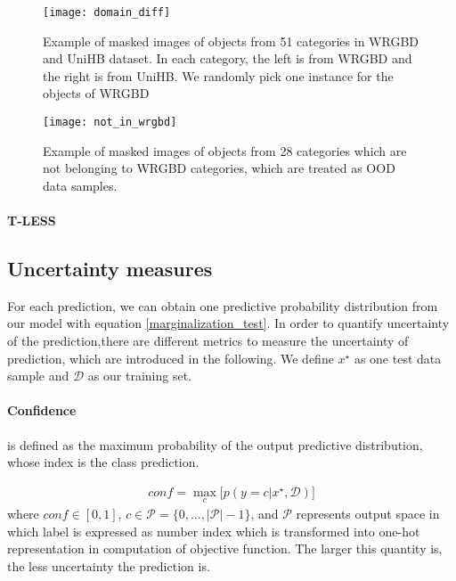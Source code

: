  \begin{figure}[H]
 	\begin{center}
 		\texttt{[image: domain\_diff]}
 		\caption{Example of masked images of objects from 51 categories in WRGBD and UniHB dataset. In each category, the left is from WRGBD and the right is from UniHB. We randomly pick one instance for the objects of WRGBD}		
 		\label{fig:wrgbd2}
 	\end{center}
 \end{figure}

\begin{figure}[H]
	\begin{center}
		\texttt{[image: not\_in\_wrgbd]}
		\caption{Example of masked images of objects from 28 categories which are not belonging to WRGBD categories, which are treated as OOD data samples.}		
		\label{fig:not_in_wrgbd}
	\end{center}
\end{figure} 

\paragraph{T-LESS\cite{hodan2017tless}}


\subsection{Uncertainty measures}
For each prediction, we can obtain one predictive probability distribution from our model with equation \ref{marginalization_test}. In order to quantify uncertainty of the prediction,there are different metrics to measure the uncertainty of prediction, which are introduced in the following. We define $x^\star$ as one test data sample and $\mathcal D$ as our training set. 
\paragraph{Confidence} is defined as the maximum probability of the output predictive distribution, whose index is the class prediction.

\begin{equation}\label{confidence}	
\begin{aligned}
conf = \max_c \big[ p(y=c|x^\star, \mathcal D) \big]
\end{aligned}
\end{equation}
where $conf \in [0,1]$, $c \in \mathcal P = \{0,...,|\mathcal P|-1\}$, and $\mathcal P$ represents output space in which label is expressed as number index which is transformed into one-hot representation in computation of objective function. The larger this quantity is, the less uncertainty the prediction is. 

